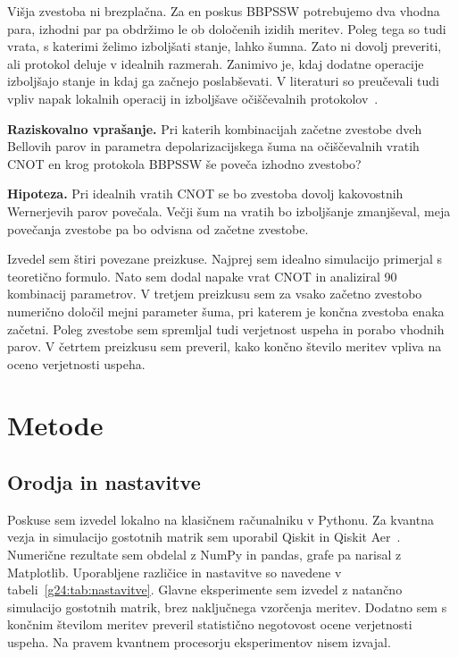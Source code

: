 Višja zvestoba ni brezplačna. Za en poskus BBPSSW potrebujemo dva vhodna para, izhodni par pa obdržimo le ob določenih izidih meritev. Poleg tega so tudi vrata, s katerimi želimo izboljšati stanje, lahko šumna. Zato ni dovolj preveriti, ali protokol deluje v idealnih razmerah. Zanimivo je, kdaj dodatne operacije izboljšajo stanje in kdaj ga začnejo poslabševati. V literaturi so preučevali tudi vpliv napak lokalnih operacij in izboljšave očiščevalnih protokolov~\cite{g24:dur1999,g24:preti2022}.

\begin{svgraybox}
\textbf{Raziskovalno vprašanje.} Pri katerih kombinacijah začetne zvestobe dveh Bellovih parov in parametra depolarizacijskega šuma na očiščevalnih vratih CNOT en krog protokola BBPSSW še poveča izhodno zvestobo?

\textbf{Hipoteza.} Pri idealnih vratih CNOT se bo zvestoba dovolj kakovostnih Wernerjevih parov povečala. Večji šum na vratih bo izboljšanje zmanjševal, meja povečanja zvestobe pa bo odvisna od začetne zvestobe.
\end{svgraybox}

Izvedel sem štiri povezane preizkuse. Najprej sem idealno simulacijo primerjal s teoretično formulo. Nato sem dodal napake vrat CNOT in analiziral 90 kombinacij parametrov. V tretjem preizkusu sem za vsako začetno zvestobo numerično določil mejni parameter šuma, pri katerem je končna zvestoba enaka začetni. Poleg zvestobe sem spremljal tudi verjetnost uspeha in porabo vhodnih parov. V četrtem preizkusu sem preveril, kako končno število meritev vpliva na oceno verjetnosti uspeha.

\section{Metode}
\label{g24:sec:metode}

\subsection{Orodja in nastavitve}
\label{g24:sec:orodja}

Poskuse sem izvedel lokalno na klasičnem računalniku v Pythonu. Za kvantna vezja in simulacijo gostotnih matrik sem uporabil Qiskit in Qiskit Aer~\cite{qiskit2024,g24:qiskit_aer_docs}. Numerične rezultate sem obdelal z NumPy in pandas, grafe pa narisal z Matplotlib. Uporabljene različice in nastavitve so navedene v tabeli~\ref{g24:tab:nastavitve}. Glavne eksperimente sem izvedel z natančno simulacijo gostotnih matrik, brez naključnega vzorčenja meritev. Dodatno sem s končnim številom meritev preveril statistično negotovost ocene verjetnosti uspeha. Na pravem kvantnem procesorju eksperimentov nisem izvajal.

